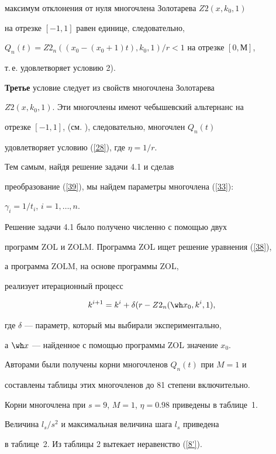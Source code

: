 максимум отклонения от нуля многочлена Золотарева $Z2(x,k_0,1)$


на отрезке $[-1,1]$ равен единице, следовательно,


$Q_n (t)= Z2_n((x_0- (x_0+1)t),k_0,1)/r <1$ на отрезке $[0,М]$,


т.\,е.{} удовлетворяет условию 2).





{\bf Третье} условие следует из свойств многочлена Золотарева


$Z2(x,k_0,1)$. Эти многочлены имеют чебышевский альтернанс на


отрезке $[-1,1]$, (см. \cite{7}), следовательно, многочлен $Q_n(t)$


удовлетворяет условию (\ref{28}), где $\eta=1/r$.





Тем самым, найдя решение задачи 4.1 и сделав


преобразование (\ref{39}), мы найдем параметры многочлена (\ref{33}):


$\gamma_{i}=1/t_i$, $i=1,\dotsc,n$.


Решение задачи 4.1 было получено численно с помощью двух


программ ZOL и ZOLM. Программа ZOL ищет решение уравнения (\ref{38}),


а программа ZOLM, на основе программы ZOL,


реализует итерационный процесс


$$


k^{i+1}=k^i +\delta (r-Z2_n(\wh x_0,k^i,1),


$$


где $\delta$ --- параметр, который мы выбирали экспериментально,


а $\wh x$ --- найденное с помощью программы ZOL значение $x_0$.





Авторами были получены корни многочленов $Q_n(t)$ при $M=1$ и


составлены таблицы этих многочленов до 81 степени включительно.


Корни многочлена при $s=9$, $M=1$, $\eta=0.98$ приведены в таблице~1.


Величина $l_s/s^2$ и максимальная величина шага $l_s$ приведена


в таблице~2. Из таблицы 2 вытекает неравенство (\ref{8'}).


